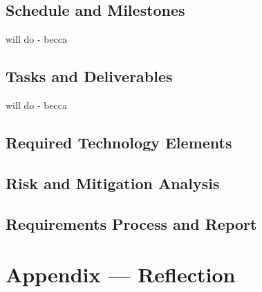 \documentclass{article}
\begin{document}
\subsection{Schedule and Milestones}\label{subsec:schedule}
\raggedright will do - becca

\subsection{Tasks and Deliverables}\label{subsec:tasks}
\raggedright will do - becca


\subsection{Required Technology Elements}\label{subsec:requiredtech}


\subsection{Risk and Mitigation Analysis}\label{subsec:risk}

\subsection{Requirements Process and Report}\label{subsec:reqprocess}


\newpage{}



\section*{Appendix --- Reflection}

\end{document}
